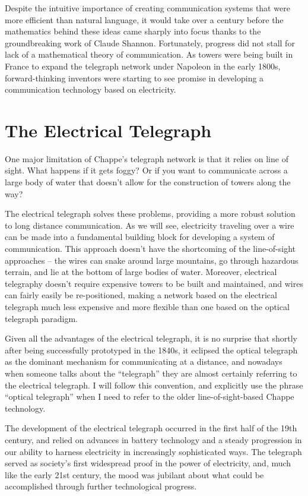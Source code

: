 \documentclass[UTF8]{book}
\begin{document}
\begin{CJK}{UTF8}{gbsn}
Despite the intuitive importance of creating communication systems that were more efficient than natural language, it would take over a century before the mathematics behind these ideas came sharply into focus thanks to the groundbreaking work of Claude Shannon. Fortunately, progress did not stall for lack of a mathematical theory of communication. As towers were being built in France to expand the telegraph network under Napoleon in the early 1800s, forward-thinking inventors were starting to see promise in developing a communication technology based on electricity.

\chapter{The Electrical Telegraph}

One major limitation of Chappe's telegraph network is that it relies on line of sight. What happens if it gets foggy? Or if you want to communicate across a large body of water that doesn't allow for the construction of towers along the way?

The electrical telegraph solves these problems, providing a more robust solution to long distance communication. As we will see, electricity traveling over a wire can be made into a fundamental building block for developing a system of communication. This approach doesn't have the shortcoming of the line-of-sight approaches – the wires can snake around large mountains, go through hazardous terrain, and lie at the bottom of large bodies of water. Moreover, electrical telegraphy doesn't require expensive towers to be built and maintained, and wires can fairly easily be re-positioned, making a network based on the electrical telegraph much less expensive and more flexible than one based on the optical telegraph paradigm.

Given all the advantages of the electrical telegraph, it is no surprise that shortly after being successfully prototyped in the 1840s, it eclipsed the optical telegraph as the dominant mechanism for communicating at a distance, and nowadays when someone talks about the ``telegraph'' they are almost certainly referring to the electrical telegraph. I will follow this convention, and explicitly use the phrase ``optical telegraph'' when I need to refer to the older line-of-sight-based Chappe technology.

The development of the electrical telegraph occurred in the first half of the 19th century, and relied on advances in battery technology and a steady progression in our ability to harness electricity in increasingly sophisticated ways. The telegraph served as society's first widespread proof in the power of electricity, and, much like the early 21st century, the mood was jubilant about what could be accomplished through further technological progress.


\end{CJK}
\end{document}
